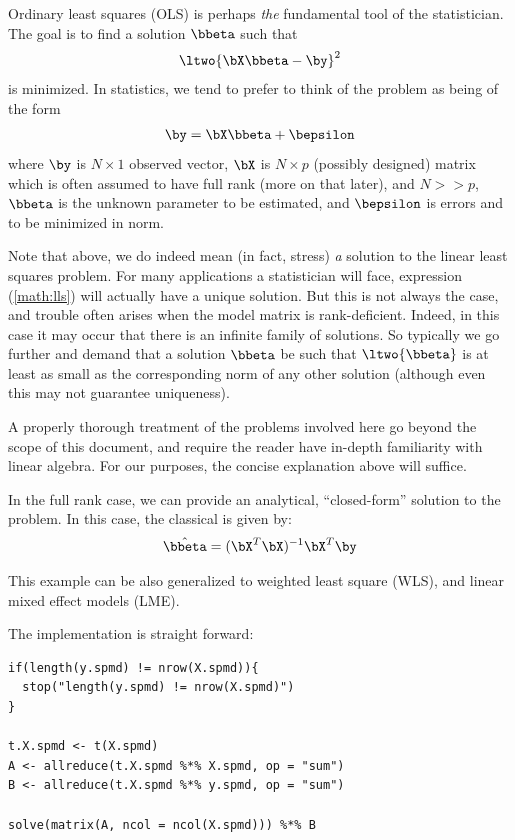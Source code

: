Ordinary least squares (OLS)
is perhaps \emph{the} fundamental tool of the statistician.  The goal is to find a solution $\bbeta$ such that
\begin{align}
\ltwo{ \bX\bbeta - \by }^2 \label{math:lls}
\end{align}
is minimized.  In statistics, we tend to prefer to think of the problem as being of the form
\begin{align}
\by = \bX\bbeta + \bepsilon \label{math:statslls}
\end{align}
where $\by$ is $N\times 1$ observed vector,
$\bX$ is $N\times p$ (possibly designed) matrix which is often assumed to have full rank (more on that later), and $N >> p$,
$\bbeta$ is the unknown parameter to be estimated,
and $\bepsilon$ is errors and to be minimized in norm.

Note that above, we do indeed mean (in fact, stress) \emph{a} solution to the linear least squares problem.  For many applications a statistician will face, expression (\ref{math:lls}) will actually have a unique solution.  But this is not always the case, and trouble often arises when the model matrix is rank-deficient.  Indeed, in this case it may occur that there is an infinite family of solutions.  So typically we go further and demand that a solution $\bbeta$ be such that $\ltwo{\bbeta}$ is at least as small as the corresponding norm of any other solution (although even this may not guarantee uniqueness).

A properly thorough treatment of the problems involved here go beyond the scope of this document, and require the reader have in-depth familiarity with linear algebra.  For our purposes, the concise explanation above will suffice.  



In the full rank case, we can provide an analytical, ``closed-form'' solution to the problem.  In this case, the classical
is given by:
\begin{align}
 \hat{\bbeta} = (\bX^T\bX)^{-1}\bX^T\by \label{math:ols}
\end{align}
 
This example can be also generalized to weighted least square (WLS),
and linear mixed effect models (LME).

The implementation is straight forward:
\begin{lstlisting}[language=rr,title=R Code]
if(length(y.spmd) != nrow(X.spmd)){
  stop("length(y.spmd) != nrow(X.spmd)")
}

t.X.spmd <- t(X.spmd)
A <- allreduce(t.X.spmd %*% X.spmd, op = "sum")
B <- allreduce(t.X.spmd %*% y.spmd, op = "sum")

solve(matrix(A, ncol = ncol(X.spmd))) %*% B
\end{lstlisting}

